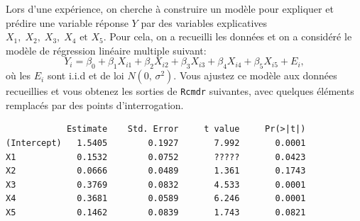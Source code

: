 \begin{questions}



\newpage
\question\label{RegMultiple} 
Lors d'une expérience, on cherche à construire un modèle pour expliquer et prédire une variable réponse $Y$ par des variables explicatives $X_1,\; X_2,\; X_3,\; X_4 \text{ et } X_5$. Pour cela, on a recueilli les données et on a considéré le modèle de régression linéaire multiple suivant:
$$Y_i=\beta_0+\beta_1X_{i1}+\beta_2X_{i2}+\beta_3X_{i3}+\beta_4X_{i4}+\beta_5X_{i5}+E_i,$$
où les $E_i$ sont  i.i.d et  de loi $N(0,\,\sigma^2).$
Vous ajustez ce modèle aux données recueillies et vous obtenez les sorties de \texttt{Rcmdr} suivantes, avec quelques éléments remplacés par des points d'interrogation.

\begin{verbatim}
            Estimate    Std. Error     t value     Pr(>|t|)
(Intercept)   1.5405        0.1927       7.992       0.0001
X1            0.1532        0.0752       ?????       0.0423 
X2            0.0666        0.0489       1.361       0.1743
X3            0.3769        0.0832       4.533       0.0001
X4            0.3681        0.0589       6.246       0.0001 
X5            0.1462        0.0839       1.743       0.0821 


\end{verbatim}
\end{questions}
